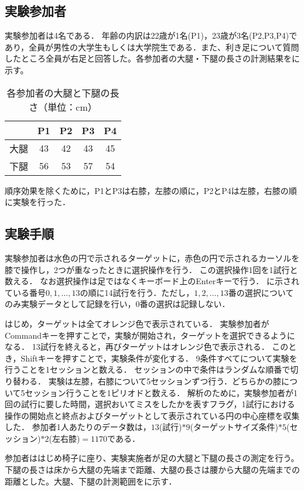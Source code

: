 \documentclass[submit, techrep]{ipsj}
\begin{document}
\subsection{実験参加者}
実験参加者は4名である．
年齢の内訳は22歳が1名(P1)，23歳が3名(P2,P3,P4)であり，全員が男性の大学生もしくは大学院生である．また、利き足について質問したところ全員が右足と回答した。各参加者の大腿・下腿の長さの計測結果をに示す。
\begin{table}[tb]
	\begin{center}
		\begin{tabular}{|c|c|c|c|c|}
		\hline
			& P1 & P2 & P3 & P4 \\ \hline
		大腿 & 43 & 42 & 43 & 45 \\ \hline
		下腿 & 56 & 53 & 57 & 54 \\ \hline
		\end{tabular}
	\end{center}
	\caption{各参加者の大腿と下腿の長さ（単位：cm）}
	\label{tb:length}
\end{table}

順序効果を除くために，P1とP3は右膝，左膝の順に，P2とP4は左膝，右膝の順に実験を行った．
\subsection{実験手順}
実験参加者は水色の円で示されるターゲットに，赤色の円で示されるカーソルを膝で操作し，2つが重なったときに選択操作を行う．
この選択操作1回を1試行と数える．
なお選択操作は足ではなくキーボード上のEnterキーで行う．
に示されている番号$0,1,...,13$の順に14試行を行う．ただし，$1,2,...,13$番の選択についてのみ実験データとして記録を行い，$0$番の選択は記録しない．\par
はじめ，ターゲットは全てオレンジ色で表示されている．
実験参加者がCommandキーを押すことで，実験が開始され，ターゲットを選択できるようになる．
13試行を終えると，再びターゲットはオレンジ色で表示される．
このとき，Shiftキーを押すことで，実験条件が変化する．
9条件すべてについて実験を行うことを1セッションと数える．
セッションの中で条件はランダムな順番で切り替わる．
実験は左膝，右膝について5セッションずつ行う．どちらかの膝について5セッション行うことを1ピリオドと数える．
解析のために，実験参加者が1回の試行に要した時間，選択おいてミスをしたかを表すフラグ，1試行における操作の開始点と終点およびターゲットとして表示されている円の中心座標を収集した．
参加者1人あたりのデータ数は，$13$(試行)$*9$(ターゲットサイズ条件)$*5$(セッション)$*2$(左右膝)$ = 1170$である．

参加者ははじめ椅子に座り、実験実施者が足の大腿と下腿の長さの測定を行う。下腿の長さは床から大腿の先端まで距離、大腿の長さは腰から大腿の先端までの距離とした。大腿、下腿の計測範囲をに示す．
\end{document}
